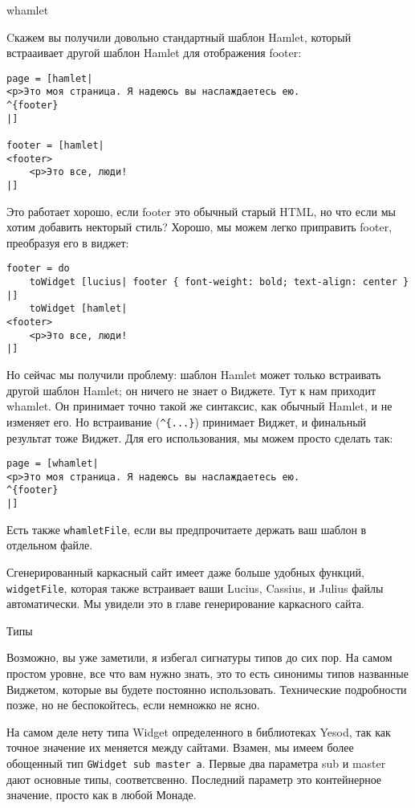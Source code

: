 whamlet

Cкажем вы получили довольно стандартный шаблон Hamlet, который встрааивает другой шаблон Hamlet для отображения footer:

\begin{lstlisting}
page = [hamlet|
<p>Это моя страница. Я надеюсь вы наслаждаетесь ею.
^{footer}
|]

footer = [hamlet|
<footer>
    <p>Это все, люди!
|]
\end{lstlisting}

Это работает хорошо, если footer это обычный старый HTML, но что если мы хотим добавить некторый стиль? Хорошо, мы можем легко приправить footer, преобразуя его в виджет:

\begin{lstlisting}
footer = do
    toWidget [lucius| footer { font-weight: bold; text-align: center } |]
    toWidget [hamlet|
<footer>
    <p>Это все, люди!
|]
\end{lstlisting}

Но сейчас мы получили проблему: шаблон Hamlet может только встраивать другой шаблон Hamlet; он ничего не знает о Виджете. Тут к нам приходит whamlet. Он принимает точно такой же синтаксис, как обычный Hamlet, и не изменяет его. Но встраивание (\lstinline!^{...}!) принимает Виджет, и финальный результат тоже Виджет. Для его использования, мы можем просто сделать так:

\begin{lstlisting}
page = [whamlet|
<p>Это моя страница. Я надеюсь вы наслаждаетесь ею.
^{footer}
|]
\end{lstlisting}


Есть также \lstinline'whamletFile', если вы предпрочитаете держать ваш шаблон в отдельном файле.

Сгенерированный каркасный сайт имеет даже больше удобных функций, \lstinline'widgetFile', которая также встраивает ваши Lucius, Cassius, и Julius файлы автоматически. Мы увидели это в главе генерирование каркасного сайта. %

Типы
    
Возможно, вы уже заметили, я избегал сигнатуры типов до сих пор. На самом простом уровне, все что вам нужно знать, это то есть синонимы типов названные Виджетом, которые вы будете постоянно использовать. Технические подробности позже, но не беспокойтесь, если немножко не ясно.

На самом деле нету типа Widget определенного в библиотеках Yesod, так как точное значение их меняется между сайтами. Взамен, мы имеем более обощенный тип \lstinline'GWidget sub master a'. Первые два параметра sub и master дают основные типы, соответсвенно. Последний параметр это контейнерное значение, просто как в любой Монаде.

